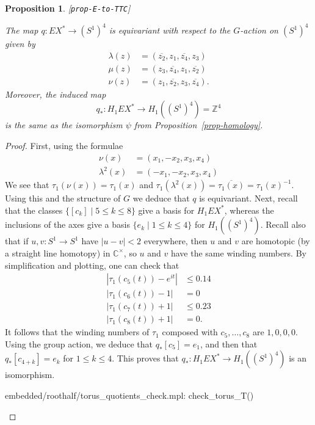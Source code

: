 \documentclass[reqno]{amsart}
\newcommand{\lbl}[1]{\label{#1}\textup{[\texttt{#1}]}\par}
\newcommand{\lbl}{\label}
\newcommand{\lm}        {\lambda}
\newcommand{\Z}         {{\mathbb{Z}}}
\newcommand{\C}         {{\mathbb{C}}}
\newcommand{\ov}[1]     {\overline{#1}}
\newcommand{\st}        {\;|\;}
\newcommand{\tm}        {\times}
\renewcommand{\:}{\colon}
\newtheorem{proposition}[theorem]{Proposition}
\theoremstyle{definition}
\begin{document}
\begin{proposition}\lbl{prop-E-to-TTC}
 The map $q\:EX^*\to(S^1)^4$ is equivariant with
 respect to the $G$-action on $(S^1)^4$ given by
 \begin{align*}
  \lm(z) &= (\ov{z_2},z_1,\ov{z_4},z_3) \\
  \mu(z) &= (z_3,\ov{z_4},z_1,\ov{z_2}) \\
  \nu(z) &= (z_1,\ov{z_2},z_3,\ov{z_4}).
 \end{align*}
 Moreover, the induced map
 \[ q_* \: H_1EX^* \to H_1((S^1)^4) = \Z^4 \]
 is the same as the isomorphism $\psi$ from
 Proposition~\ref{prop-homology}.
\end{proposition}
\begin{proof}
 First, using the formulae
 \begin{align*}
  \nu(x) &= (x_1,-x_2,x_3,x_4) \\
  \lm^2(x) &= (-x_1,-x_2,x_3,x_4)
 \end{align*}
 We see that $\tau_1(\nu(x))=\tau_1(x)$
 and $\tau_1(\lm^2(x))=\ov{\tau_1(x)}=\tau_1(x)^{-1}$.  Using this and
 the structure of $G$ we deduce that $q$ is equivariant.  Next, recall
 that the classes $\{[c_k]\st 5\leq k\leq 8\}$ give a basis for
 $H_1EX^*$, whereas the inclusions of the axes give a basis
 $\{e_k\st 1\leq k\leq 4\}$ for $H_1((S^1)^4)$.  Recall also that if
 $u,v\:S^1\to S^1$ have $|u-v|<2$ everywhere, then $u$ and $v$ are
 homotopic (by a straight line homotopy) in $\C^\tm$, so $u$ and $v$
 have the same winding numbers.  By simplification and plotting, one
 can check that
 \begin{align*}
  |\tau_1(c_5(t))-e^{it}| &\leq 0.14 \\
  |\tau_1(c_6(t))-1| &= 0 \\
  |\tau_1(c_7(t))+1| &\leq 0.23 \\
  |\tau_1(c_8(t))+1| &= 0.
 \end{align*}
 It follows that the winding numbers of $\tau_1$ composed with
 $c_5,\dotsc,c_8$ are $1,0,0,0$.  Using the group action, we deduce
 that $q_*[c_5]=e_1$, and then that $q_*[c_{4+k}]=e_k$ for
 $1\leq k\leq 4$.  This proves that $q_*\:H_1EX^*\to H_1((S^1)^4)$ is
 an isomorphism.
 \begin{checks}
  embedded/roothalf/torus_quotients_check.mpl: check_torus_T()
 \end{checks}
\end{proof}
\end{document}
